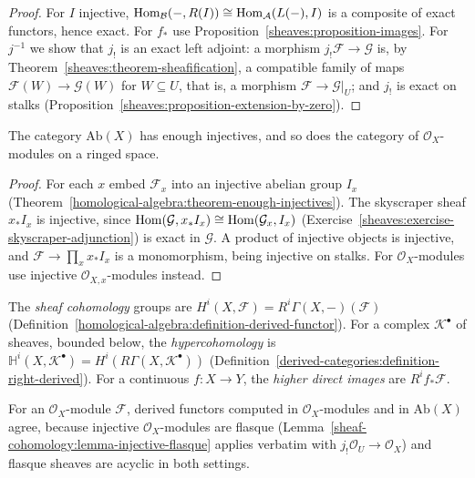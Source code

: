 \begin{proof}
For $I$ injective, $\operatorname{Hom}_\mathcal{B}(-, R(I)) \cong \operatorname{Hom}_\mathcal{A}(L(-), I)$ is a composite of exact functors, hence exact. For $f_*$ use
Proposition~\ref{sheaves:proposition-images}. For $j^{-1}$ we show that $j_!$ is an exact left adjoint: a morphism $j_!\mathcal{F} \to \mathcal{G}$ is, by
Theorem~\ref{sheaves:theorem-sheafification}, a compatible family of maps $\mathcal{F}(W) \to \mathcal{G}(W)$ for $W \subseteq U$, that is, a morphism
$\mathcal{F} \to \mathcal{G}|_U$; and $j_!$ is exact on stalks (Proposition~\ref{sheaves:proposition-extension-by-zero}).
\end{proof}

\begin{theorem}\label{sheaf-cohomology:theorem-enough-injectives}
The category $\mathrm{Ab}(X)$ has enough injectives, and so does the category of $\mathcal{O}_X$-modules on a ringed space.
\end{theorem}

\begin{proof}
For each $x$ embed $\mathcal{F}_x$ into an injective abelian group $I_x$ (Theorem~\ref{homological-algebra:theorem-enough-injectives}). The skyscraper sheaf $x_*I_x$ is injective,
since $\operatorname{Hom}(\mathcal{G}, x_*I_x) \cong \operatorname{Hom}(\mathcal{G}_x, I_x)$ (Exercise~\ref{sheaves:exercise-skyscraper-adjunction}) is exact in $\mathcal{G}$. A product of injective objects is
injective, and $\mathcal{F} \to \prod_x x_*I_x$ is a monomorphism, being injective on stalks. For $\mathcal{O}_X$-modules use injective $\mathcal{O}_{X,x}$-modules instead.
\end{proof}

\begin{definition}\label{sheaf-cohomology:definition-sheaf-cohomology}
The \emph{sheaf cohomology} groups are $H^i(X, \mathcal{F}) = R^i\Gamma(X, -)(\mathcal{F})$ (Definition~\ref{homological-algebra:definition-derived-functor}). For a complex
$\mathcal{K}^\bullet$ of sheaves, bounded below, the \emph{hypercohomology} is $\mathbb{H}^i(X, \mathcal{K}^\bullet) = H^i(R\Gamma(X, \mathcal{K}^\bullet))$
(Definition~\ref{derived-categories:definition-right-derived}). For a continuous $f \colon X \to Y$, the \emph{higher direct images} are $R^if_*\mathcal{F}$.
\end{definition}

\begin{remark}\label{sheaf-cohomology:remark-cohomology-modules}
For an $\mathcal{O}_X$-module $\mathcal{F}$, derived functors computed in $\mathcal{O}_X$-modules and in $\mathrm{Ab}(X)$ agree, because injective $\mathcal{O}_X$-modules are flasque
(Lemma~\ref{sheaf-cohomology:lemma-injective-flasque} applies verbatim with $j_!\mathcal{O}_U \to \mathcal{O}_X$) and flasque sheaves are acyclic in both settings.
\end{remark}

